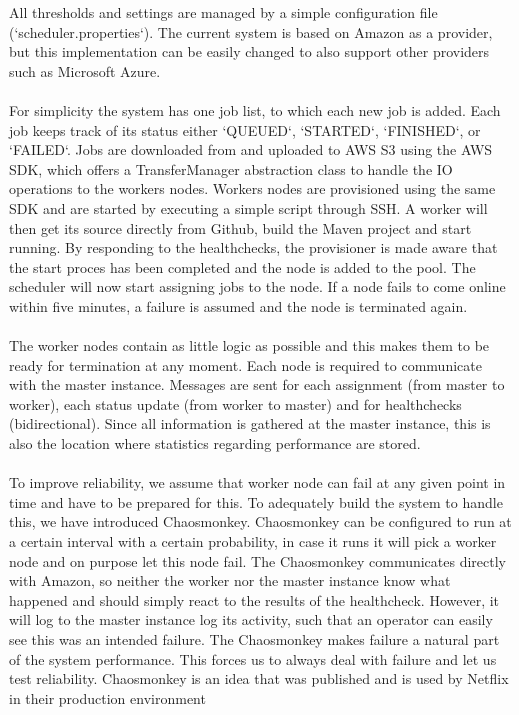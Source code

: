 \documentclass[a4paper]{IEEEtran}
\begin{document}
All thresholds and settings are managed by a simple configuration file (`scheduler.properties`).
The current system is based on Amazon as a provider, but this implementation can be easily changed to also support other providers such as Microsoft Azure.
\\
\\
For simplicity the system has one job list, to which each new job is added.
Each job keeps track of its status either `QUEUED`, `STARTED`, `FINISHED`, or `FAILED`.
Jobs are downloaded from and uploaded to AWS S3 using the AWS SDK, which offers a TransferManager abstraction class to handle the IO operations to the workers nodes.
Workers nodes are provisioned using the same SDK and are started by executing a simple script through SSH.
A worker will then get its source directly from Github, build the Maven project and start running.
By responding to the healthchecks, the provisioner is made aware that the start proces has been completed
and the node is added to the pool. 
The scheduler will now start assigning jobs to the node.
If a node fails to come online within five minutes, a failure is assumed and the node is terminated again.
\\
\\
The worker nodes contain as little logic as possible and this makes them to be ready for termination at any moment.
Each node is required to communicate with the master instance.
Messages are sent for each assignment (from master to worker), each status update (from worker to master) and for healthchecks (bidirectional).
Since all information is gathered at the master instance, this is also the location where statistics regarding performance are stored.
\\
\\
To improve reliability, we assume that worker node can fail at any given point in time
and have to be prepared for this.
To adequately build the system to handle this, we have introduced Chaosmonkey.
Chaosmonkey can be configured to run at a certain interval with a certain probability, in case it runs it will pick a worker node 
and on purpose let this node fail.
The Chaosmonkey communicates directly with Amazon, so neither the worker nor the master instance know what happened and should simply react to the results of the healthcheck.
However, it will log to the master instance log its activity, such that an operator can easily see this was an intended failure.
The Chaosmonkey makes failure a natural part of the system performance.
This forces us to always deal with failure and let us test reliability.
Chaosmonkey is an idea that was published and is used by Netflix in their production environment\cite{Netflix-cm}
\end{document}
